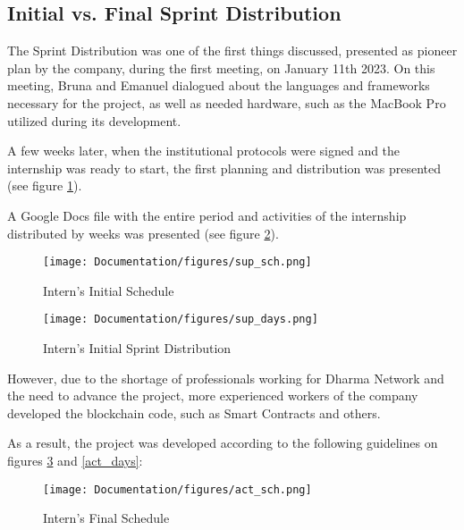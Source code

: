 \subsection{Initial vs. Final Sprint Distribution}\label{sprint}

The Sprint Distribution was one of the first things discussed, presented as pioneer plan by the company, during the first meeting, on January 11th 2023. On this meeting, Bruna and Emanuel dialogued about the languages and frameworks necessary for the project, as well as needed hardware, such as the MacBook Pro utilized during its development.\newline

A few weeks later, when the institutional protocols were signed and the internship was ready to start,  the first planning and distribution was presented (see figure \ref{sup_sch}).\newline

A Google Docs file with the entire period  and activities of the internship distributed by weeks was presented (see figure \ref{sup_days}).\newline

 \begin{figure}[htbp]
	\centering
	\texttt{[image: Documentation/figures/sup\_sch.png]}  %
	\caption{Intern's Initial Schedule}
	\label{sup_sch}
\end{figure}

 \begin{figure}[htbp]
	\centering
	\texttt{[image: Documentation/figures/sup\_days.png]}  %
	\caption{Intern's Initial Sprint Distribution}
	\label{sup_days}
\end{figure}


However, due to the shortage of professionals working for Dharma Network and the need to advance the project, more experienced workers of the company developed the blockchain code, such as Smart Contracts and others.\newline

As a result, the project was developed according to the following guidelines on figures \ref{act_sch} and \ref{act_days}:\newline

 \begin{figure}[htbp]
	\centering
	\texttt{[image: Documentation/figures/act\_sch.png]}  %
	\caption{Intern's Final Schedule}
	\label{act_sch}
\end{figure}

